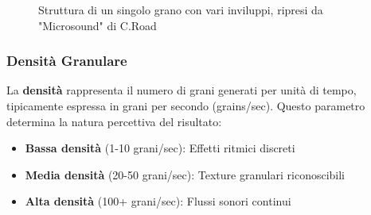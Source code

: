 \documentclass[a4paper,11pt,openany]{book}
\begin{document}
\begin{figure}[H]
    \centering
    \caption{Struttura di un singolo grano con vari inviluppi, ripresi da "Microsound" di C.Road}
    \label{fig:grain_anatomy}
\end{figure}

\subsubsection{Densità Granulare}

La \textbf{densità} rappresenta il numero di grani generati per unità di tempo, tipicamente espressa in grani per secondo (grains/sec). Questo parametro determina la natura percettiva del risultato:

\begin{itemize}
    \item \textbf{Bassa densità} (1-10 grani/sec): Effetti ritmici discreti
    \item \textbf{Media densità} (20-50 grani/sec): Texture granulari riconoscibili
    \item \textbf{Alta densità} (100+ grani/sec): Flussi sonori continui
\end{itemize}
\end{document}
